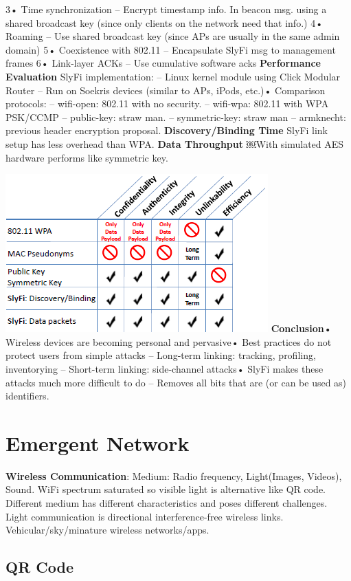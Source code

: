 \documentclass[9pt]{extarticle}
\begin{document}
\begin{multicols}{2}
3• Time synchronization – Encrypt timestamp info. In beacon msg. using a shared broadcast key (since only clients on the network need that info.) 4• Roaming – Use shared broadcast key (since APs are usually in the same admin domain) 5• Coexistence with 802.11 – Encapsulate SlyFi msg to management frames 6• Link-layer ACKs – Use cumulative software acks \textbf{Performance Evaluation} SlyFi implementation: – Linux kernel module using Click Modular Router – Run on Soekris devices (similar to APs, iPods, etc.)• Comparison protocols: – wifi-open: 802.11 with no security. – wifi-wpa: 802.11 with WPA PSK/CCMP – public-key: straw man. – symmetric-key: straw man – armknecht: previous header encryption proposal. \textbf{Discovery/Binding Time} SlyFi link setup has less overhead than WPA. \textbf{Data Throughput} ￼With simulated AES hardware performs like symmetric key. 

\includegraphics{slyfi.png}
\textbf{Conclusion}• Wireless devices are becoming personal and pervasive• Best practices do not protect users from simple attacks – Long-term linking: tracking, profiling, inventorying – Short-term linking: side-channel attacks• SlyFi makes these attacks much more difficult to do – Removes all bits that are (or can be used as) identifiers.

\section{Emergent Network}

\textbf{Wireless Communication}: Medium: Radio frequency, Light(Images, Videos), Sound. WiFi spectrum saturated so visible light is alternative like QR code. Different medium has different characteristics and poses different challenges. Light communication is directional interference-free wireless links. Vehicular/sky/minature wireless networks/apps.

\subsection{QR Code}


\end{multicols}
\end{document}

